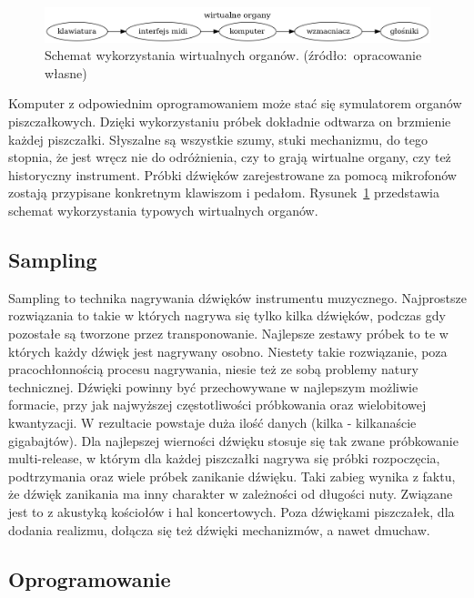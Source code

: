 \documentclass[11pt]{report}
\begin{document}
    \begin{figure}[!htp]
        \centering
        \includegraphics[width=\linewidth]{fig/organizacja.png}
        \caption{Schemat wykorzystania wirtualnych organów. (źródło:~opracowanie własne)}
        \label{fig:schemat}
    \end{figure}

    Komputer z odpowiednim oprogramowaniem może stać się symulatorem organów piszczałkowych.
    Dzięki wykorzystaniu próbek dokładnie odtwarza on brzmienie każdej piszczałki.
    Słyszalne są wszystkie szumy, stuki mechanizmu, do tego stopnia, że jest wręcz nie do odróżnienia, czy to grają wirtualne organy, czy też historyczny instrument.
    Próbki dźwięków zarejestrowane za pomocą mikrofonów zostają przypisane konkretnym klawiszom i pedałom.
    Rysunek~\ref{fig:schemat} przedstawia schemat wykorzystania typowych wirtualnych organów.

    \subsection{Sampling}
    Sampling to technika nagrywania dźwięków instrumentu muzycznego.
    Najprostsze rozwiązania to takie w których nagrywa się tylko kilka dźwięków, podczas gdy pozostałe są tworzone przez transponowanie.
    Najlepsze zestawy próbek to te w których każdy dźwięk jest nagrywany osobno.
    Niestety takie rozwiązanie, poza pracochłonnością procesu nagrywania, niesie też ze sobą problemy natury technicznej.
    Dźwięki powinny być przechowywane w najlepszym możliwie formacie, przy jak najwyższej częstotliwości próbkowania oraz wielobitowej kwantyzacji.
    W rezultacie powstaje duża ilość danych (kilka - kilkanaście gigabajtów).
    Dla najlepszej wierności dźwięku stosuje się tak zwane próbkowanie multi-release,
    w którym dla każdej piszczałki nagrywa się próbki rozpoczęcia, podtrzymania oraz wiele próbek zanikanie dźwięku.
    Taki zabieg wynika z faktu, że dźwięk zanikania ma inny charakter w zależności od długości nuty.
    Związane jest to z akustyką kościołów i hal koncertowych.
    Poza dźwiękami piszczałek, dla dodania realizmu, dołącza się też dźwięki mechanizmów, a nawet dmuchaw.

    \subsection{Oprogramowanie}
\end{document}
